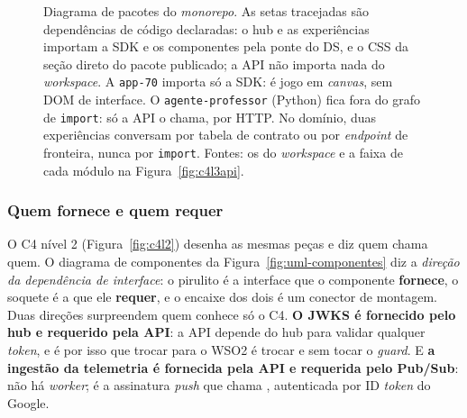 \begin{figure}[H]
{\begin{tikzpicture}[x=1cm, y=1cm]
\end{tikzpicture}}
\caption[Pacotes: quem pode importar quem]{Diagrama de pacotes do
  \emph{monorepo}. As setas tracejadas são dependências de código declaradas: o
  hub e as experiências importam a SDK e os componentes pela ponte do DS, e o CSS
  da seção direto do pacote publicado; a API não importa nada do
  \emph{workspace}. A \texttt{app-70} importa só a SDK: é jogo em \emph{canvas},
  sem DOM de interface. O \texttt{agente-professor} (Python) fica fora do grafo
  de \texttt{import}: só a API o chama, por HTTP. No domínio, duas experiências
  conversam por tabela de contrato ou por \emph{endpoint} de fronteira, nunca
  por \texttt{import}. Fontes: os  do \emph{workspace} e a faixa de cada
  módulo na Figura~\ref{fig:c4l3api}.}
\label{fig:uml-pacotes}
\end{figure}

\subsubsection{Quem fornece e quem requer}

O C4 nível 2 (Figura~\ref{fig:c4l2}) desenha as mesmas peças e diz quem chama
quem. O diagrama de componentes da Figura~\ref{fig:uml-componentes} diz a
\emph{direção da dependência de interface}: o pirulito é a interface que o
componente \textbf{fornece}, o soquete é a que ele \textbf{requer}, e o encaixe dos
dois é um conector de montagem. Duas direções surpreendem quem conhece só o
C4. \textbf{O JWKS é fornecido pelo hub e requerido pela API}: a API depende do
hub para validar qualquer \emph{token}, e é por isso que trocar para o WSO2 é
trocar  e  sem tocar o \emph{guard}. E
\textbf{a ingestão da telemetria é fornecida pela API e requerida pelo Pub/Sub}:
não há \emph{worker}; é a assinatura \emph{push} que chama
, autenticada por ID \emph{token} do Google.

